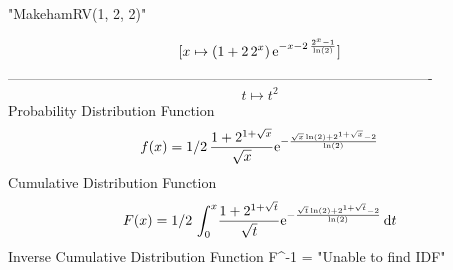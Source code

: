 \documentclass[12pt]{article}
\begin{document}
 
                            "MakehamRV(1, 2, 2)"

$$[x\mapsto  \left( 1+2\,{2}^{x} \right) {{\rm e}^{-x-2\,{\frac {{2}^{x}
-1}{\ln  \left( 2 \right) }}}}]
$$-------------------------------------------------------------------------------------------  \\$$t\mapsto {t}^{2}
$$Probability Distribution Function 
$$  f(x)=1/2\,{\frac {1+{2}^{1+\sqrt {x}}}{\sqrt {x}}{{\rm e}^{-{\frac {\sqrt {
x}\ln  \left( 2 \right) +{2}^{1+\sqrt {x}}-2}{\ln  \left( 2 \right) }}
}}}
$$Cumulative Distribution Function  
 $$F(x)=1/2\,\int_{0}^{x}\!{\frac {1+{2}^{1+\sqrt {t}}}{\sqrt {t}}{{\rm e}^{-{
\frac {\sqrt {t}\ln  \left( 2 \right) +{2}^{1+\sqrt {t}}-2}{\ln 
 \left( 2 \right) }}}}}\,{\rm d}t
$$ Inverse Cumulative Distribution Function 
  $$F^{-1} =                             "Unable to find IDF"
\end{document}

